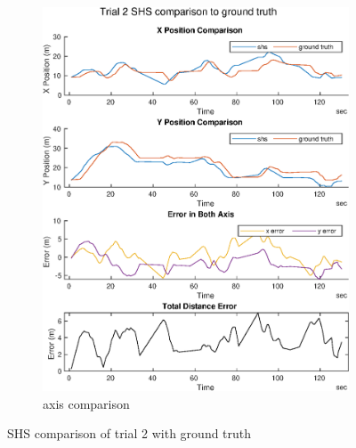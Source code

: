 \begin{figure}[H]
\begin{subfigure}[t]{.45\textwidth}
		\includegraphics[width=\linewidth]{images/20201029_1042_trial2_shs_2}
		\caption{axis comparison}
		\label{fig:trial2_comparison}
	\end{subfigure}
	\caption{SHS comparison of trial 2 with ground truth}
	\label{fig:trial2_shs_gt_comparison}
\end{figure}

\newpage
